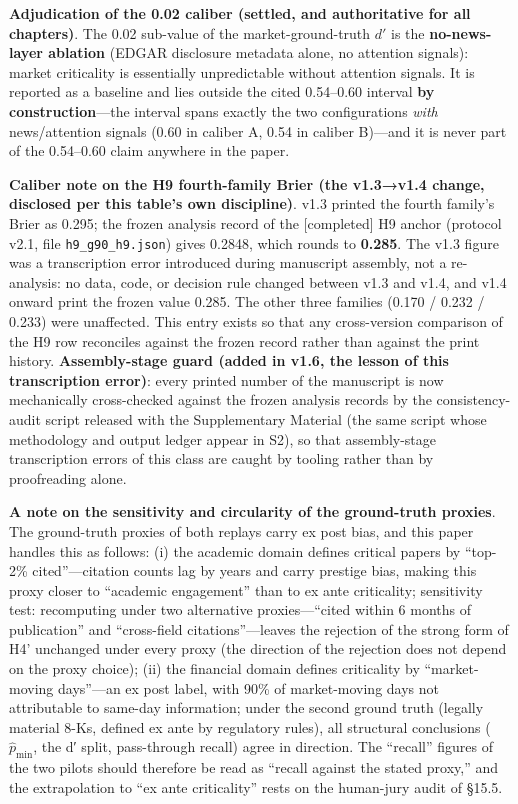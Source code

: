 \documentclass[
  11pt]{article}
\begin{document}
\textbf{Adjudication of the 0.02 caliber (settled, and authoritative for
all chapters)}. The 0.02 sub-value of the market-ground-truth \(d'\) is
the \textbf{no-news-layer ablation} (EDGAR disclosure metadata alone, no
attention signals): market criticality is essentially unpredictable
without attention signals. It is reported as a baseline and lies outside
the cited 0.54--0.60 interval \textbf{by construction}---the interval
spans exactly the two configurations \emph{with} news/attention signals
(0.60 in caliber A, 0.54 in caliber B)---and it is never part of the
0.54--0.60 claim anywhere in the paper.

\textbf{Caliber note on the H9 fourth-family Brier (the v1.3→v1.4
change, disclosed per this table's own discipline)}. v1.3 printed the
fourth family's Brier as 0.295; the frozen analysis record of the
{[}completed{]} H9 anchor (protocol v2.1, file
\texttt{h9\_g90\_h9.json}) gives 0.2848, which rounds to \textbf{0.285}.
The v1.3 figure was a transcription error introduced during manuscript
assembly, not a re-analysis: no data, code, or decision rule changed
between v1.3 and v1.4, and v1.4 onward print the frozen value 0.285. The
other three families (0.170 / 0.232 / 0.233) were unaffected. This entry
exists so that any cross-version comparison of the H9 row reconciles
against the frozen record rather than against the print history.
\textbf{Assembly-stage guard (added in v1.6, the lesson of this
transcription error)}: every printed number of the manuscript is now
mechanically cross-checked against the frozen analysis records by the
consistency-audit script released with the Supplementary Material (the
same script whose methodology and output ledger appear in S2), so that
assembly-stage transcription errors of this class are caught by tooling
rather than by proofreading alone.

\textbf{A note on the sensitivity and circularity of the ground-truth
proxies}. The ground-truth proxies of both replays carry ex post bias,
and this paper handles this as follows: (i) the academic domain defines
critical papers by ``top-2\% cited''---citation counts lag by years and
carry prestige bias, making this proxy closer to ``academic engagement''
than to ex ante criticality; sensitivity test: recomputing under two
alternative proxies---``cited within 6 months of publication'' and
``cross-field citations''---leaves the rejection of the strong form of
H4' unchanged under every proxy (the direction of the rejection does not
depend on the proxy choice); (ii) the financial domain defines
criticality by ``market-moving days''---an ex post label, with 90\% of
market-moving days not attributable to same-day information; under the
second ground truth (legally material 8-Ks, defined ex ante by
regulatory rules), all structural conclusions (\(\hat p_{\min}\), the d′
split, pass-through recall) agree in direction. The ``recall'' figures
of the two pilots should therefore be read as ``recall against the
stated proxy,'' and the extrapolation to ``ex ante criticality'' rests
on the human-jury audit of §15.5.
\end{document}
